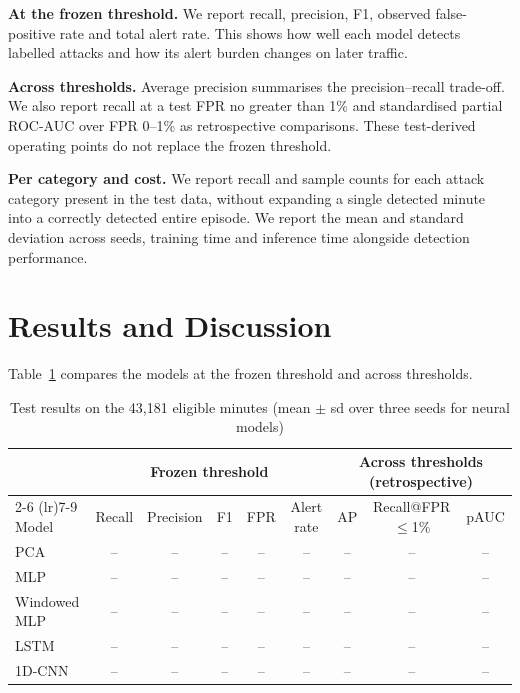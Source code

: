 \documentclass[conference]{IEEEtran}
\begin{document}
\textbf{At the frozen threshold.} We report recall, precision, F1, observed false-positive rate and total alert rate. This shows how well each model detects labelled attacks and how its alert burden changes on later traffic.

\textbf{Across thresholds.} Average precision summarises the precision--recall trade-off. We also report recall at a test FPR no greater than 1\% and standardised partial ROC-AUC over FPR 0--1\% as retrospective comparisons. These test-derived operating points do not replace the frozen threshold.

\textbf{Per category and cost.} We report recall and sample counts for each attack category present in the test data, without expanding a single detected minute into a correctly detected entire episode. We report the mean and standard deviation across seeds, training time and inference time alongside detection performance.

\section{Results and Discussion}

Table~\ref{tab:results} compares the models at the frozen threshold and across thresholds.

\begin{table}[t]
\caption{Test results on the 43,181 eligible minutes (mean $\pm$ sd over three seeds for neural models)}
\label{tab:results}
\centering
\begin{tabular}{lcccccccc}
\toprule
& \multicolumn{5}{c}{Frozen threshold} & \multicolumn{3}{c}{Across thresholds (retrospective)} \\
\cmidrule(lr){2-6} \cmidrule(lr){7-9}
Model & Recall & Precision & F1 & FPR & Alert rate & AP & Recall@FPR$\le$1\% & pAUC \\
\midrule
PCA & -- & -- & -- & -- & -- & -- & -- & -- \\
MLP & -- & -- & -- & -- & -- & -- & -- & -- \\
Windowed MLP & -- & -- & -- & -- & -- & -- & -- & -- \\
LSTM & -- & -- & -- & -- & -- & -- & -- & -- \\
1D-CNN & -- & -- & -- & -- & -- & -- & -- & -- \\
\bottomrule
\end{tabular}
\end{table}
\end{document}
